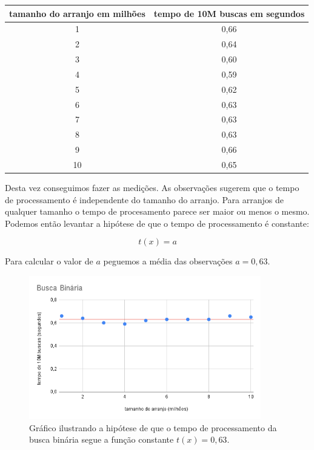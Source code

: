 \begin{table}
  \label{tab:observacao3}
  \begin{tabular}{|c|c|}
    \hline
    tamanho do arranjo em milhões & tempo de 10M buscas em segundos \\
    \hline 
    1                             & 0,66                            \\
    2                             & 0,64                            \\
    3                             & 0,60                            \\
    4                             & 0,59                            \\
    5                             & 0,62                            \\
    6                             & 0,63                            \\
    7                             & 0,63                            \\
    8                             & 0,63                            \\
    9                             & 0,66                            \\
    10                            & 0,65                            \\
    \hline
  \end{tabular}
\end{table}

Desta vez conseguimos fazer as medições.
As observações sugerem que o tempo de processamento é independente do tamanho do arranjo.
Para arranjos de qualquer tamanho o tempo de procesamento parece ser maior ou menos o mesmo.
Podemos então levantar a hipótese de que o tempo de processamento é constante:

\begin{displaymath}
  t(x) = a
\end{displaymath}

Para calcular o valor de $a$ peguemos a média das observações $a = 0,63$.

\begin{figure}[htp]
  \label{fig:hipotese2}
  \includegraphics[width=0.9\textwidth]{imagens/grafico3.png}
  \caption{Gráfico ilustrando a hipótese de que o tempo de processamento da busca binária segue a função constante $t(x) = 0,63$.}
\end{figure}

